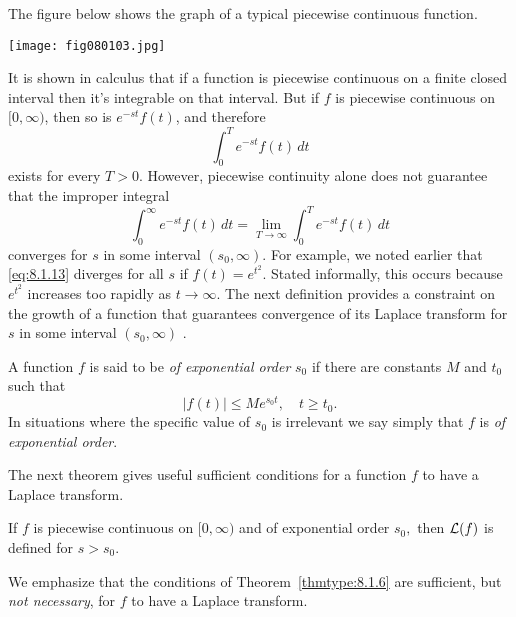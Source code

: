 \documentclass{ximera}
\begin{document}
The figure below shows the graph of a typical piecewise
continuous function.

\begin{image}
 \texttt{[image: fig080103.jpg]}
 \end{image}


It is shown in calculus that if a function is piecewise continuous on
a finite closed interval then it's integrable on that interval. But
if $f$ is piecewise continuous on $[0,\infty)$, then so is $e^{-st}f
(t)$, and therefore
$$
\int_0^T e^{-st}f(t)\,dt
$$
exists for every $T>0$. However, piecewise continuity alone does not
guarantee that the improper integral
\begin{equation}\label{eq:8.1.13}
\int_0^\infty e^{-st}f(t)\,dt=\lim_{T\rightarrow\infty}\int_0^T e^{-st}f(t)\,
dt
\end{equation}
converges for $s$ in some interval $(s_0,\infty)$. For example, we
noted earlier that \eqref{eq:8.1.13} diverges for all $s$ if
$f(t)=e^{t^2}$. Stated informally, this occurs because $e^{t^2}$
increases too rapidly as $t\rightarrow\infty$. The next definition
provides a constraint on the growth of a function that guarantees
convergence of its Laplace transform for $s$ in some interval
$(s_0,\infty)$ .

\begin{definition}\label{thmtype:8.1.5} A
function $f$ is said to be
\textit{of exponential order} $s_0$ if there are constants $M$ and $t_0$
such that
\begin{equation}\label{eq:8.1.14}
|f(t)|\leq Me^{s_0t},\quad t\geq t_0.
\end{equation}
In situations where the specific value of $s_0$
is irrelevant we say simply that $f$ is \textit{of exponential order}.
\end{definition}

The next theorem gives useful sufficient conditions for a function $f$
to have a Laplace transform.  

\begin{theorem}\label{thmtype:8.1.6} If $f$
is piecewise continuous on $[0,\infty)$ and of exponential order $s_0,$
 then ${\cal L}(f)$ is defined for $s>s_0$.
\end{theorem}

\begin{remark}
We emphasize that the conditions of Theorem~\ref{thmtype:8.1.6}
 are sufficient, but \textit{not necessary}, for $f$ to have a Laplace transform. 
\end{remark}
\end{document}

